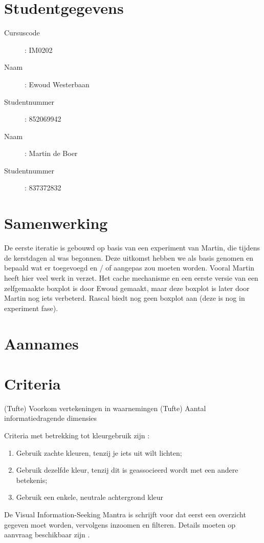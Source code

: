 \documentclass[a4paper]{article}
\begin{document}
\pagestyle{fancy}

\section*{Studentgegevens}
\begin{description}
	\item [Cursuscode]: IM0202
	\item [Naam]: Ewoud Westerbaan
	\item [Studentnummer]: 852069942
	\item [Naam]: Martin de Boer
	\item [Studentnummer]: 837372832
\end{description}

\section{Samenwerking}
De eerste iteratie is gebouwd op basis van een experiment van Martin, die tijdens de kerstdagen al was begonnen. Deze uitkomst hebben we als basis genomen en bepaald wat er toegevoegd en / of aangepas zou moeten worden. Vooral Martin heeft hier veel werk in verzet.
Het cache mechanisme en een eerste versie van een zelfgemaakte boxplot is door Ewoud gemaakt, maar deze boxplot is later door Martin nog iets verbeterd. Rascal biedt nog geen boxplot aan (deze is nog in experiment fase).


\section{Aannames}


\section{Criteria}
(Tufte) Voorkom vertekeningen in waarnemingen
(Tufte) Aantal informatiedragende dimensies

Criteria met betrekking tot kleurgebruik zijn \cite{B}:
\begin{enumerate}
\item Gebruik zachte kleuren, tenzij je iets uit wilt lichten;
\item Gebruik dezelfde kleur, tenzij dit is geassocieerd wordt met een andere betekenis;
\item Gebruik een enkele, neutrale achtergrond kleur
\end{enumerate}

De Visual Information-Seeking Mantra is schrijft voor dat eerst een overzicht gegeven moet worden, vervolgens inzoomen en filteren. Details moeten op aanvraag beschikbaar zijn \cite{A}.
\end{document}
